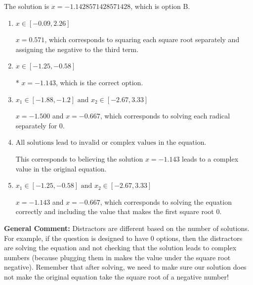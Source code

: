 \documentclass{extbook}[14pt]
\begin{document}
\begin{enumerate}
{The solution is \( x = -1.1428571428571428 \), which is option B.\begin{enumerate}[label=\Alph*.]
\item \( x \in [-0.09,2.26] \)

$x = 0.571$, which corresponds to squaring each square root separately and assigning the negative to the third term.
\item \( x \in [-1.25,-0.58] \)

* $x = -1.143$, which is the correct option.
\item \( x_1 \in [-1.88, -1.2] \text{ and } x_2 \in [-2.67,3.33] \)

$x = -1.500$ and $x = -0.667$, which corresponds to solving each radical separately for 0.
\item \( \text{All solutions lead to invalid or complex values in the equation.} \)

This corresponds to believing the solution $x = -1.143$ leads to a complex value in the original equation.
\item \( x_1 \in [-1.25, -0.58] \text{ and } x_2 \in [-2.67,3.33] \)

$x = -1.143$ and $x = -0.667$, which corresponds to solving the equation correctly and including the value that makes the first square root 0.
\end{enumerate}

\textbf{General Comment:} Distractors are different based on the number of solutions. For example, if the question is designed to have 0 options, then the distractors are solving the equation and not checking that the solution leads to complex numbers (because plugging them in makes the value under the square root negative). Remember that after solving, we need to make sure our solution does not make the original equation take the square root of a negative number!
}
\end{enumerate}
\end{document}
